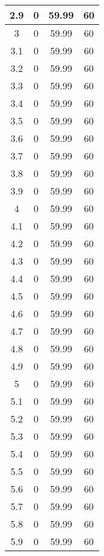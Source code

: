 \begin{longtable}[c]{|c|c|c|c|}
2.9 &	0    &	59.99 &	60 \\ \hline 
3   &	0    &	59.99 &	60 \\ \hline 
3.1 &	0    &	59.99 &	60 \\ \hline 
3.2 &	0    &	59.99 &	60 \\ \hline 
3.3 &	0    &	59.99 &	60 \\ \hline 
3.4 &	0    &	59.99 &	60 \\ \hline 
3.5 &	0    &	59.99 &	60 \\ \hline 
3.6 &	0    &	59.99 &	60 \\ \hline 
3.7 &	0    &	59.99 &	60 \\ \hline 
3.8 &	0    &	59.99 &	60 \\ \hline 
3.9 &	0    &	59.99 &	60 \\ \hline 
4   &	0    &	59.99 &	60 \\ \hline 
4.1 &	0    &	59.99 &	60 \\ \hline 
4.2 &	0    &	59.99 &	60 \\ \hline 
4.3 &	0    &	59.99 &	60 \\ \hline 
4.4 &	0    &	59.99 &	60 \\ \hline 
4.5 &	0    &	59.99 &	60 \\ \hline 
4.6 &	0    &	59.99 &	60 \\ \hline 
4.7 &	0    &	59.99 &	60 \\ \hline 
4.8 &	0    &	59.99 &	60 \\ \hline 
4.9 &	0    &	59.99 &	60 \\ \hline 
5   &	0    &	59.99 &	60 \\ \hline 
5.1 &	0    &	59.99 &	60 \\ \hline 
5.2 &	0    &	59.99 &	60 \\ \hline 
5.3 &	0    &	59.99 &	60 \\ \hline 
5.4 &	0    &	59.99 &	60 \\ \hline 
5.5 &	0    &	59.99 &	60 \\ \hline 
5.6 &	0    &	59.99 &	60 \\ \hline 
5.7 &	0    &	59.99 &	60 \\ \hline 
5.8 &	0    &	59.99 &	60 \\ \hline 
5.9 &	0    &	59.99 &	60 \\ \hline 
\end{longtable}




